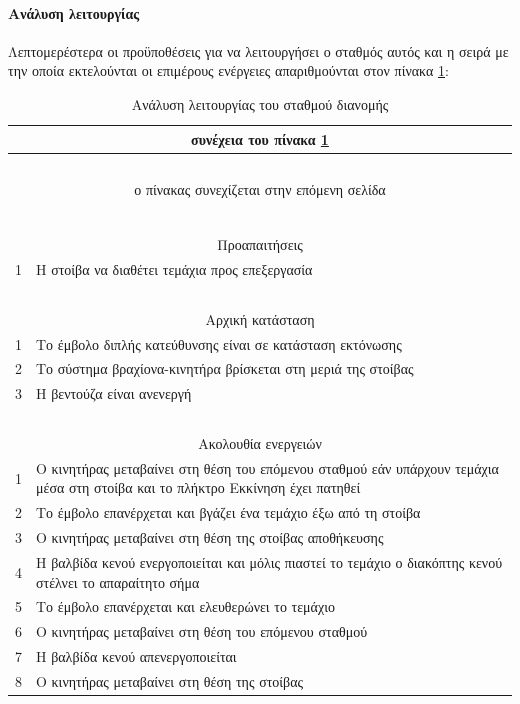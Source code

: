 \documentclass[a4paper,12pt,twoside]{report}
\begin{document}
{				\paragraph{Ανάλυση λειτουργίας} {Λεπτομερέστερα οι προϋποθέσεις για να λειτουργήσει ο σταθμός αυτός και η σειρά με την οποία εκτελούνται οι επιμέρους ενέργειες απαριθμούνται στον πίνακα \ref{πιν.:Ανάλυση λειτουργίας του σταθμού διανομής}:
				}
				\begin{longtable} { m{0.5cm} m{12cm} }
					\caption [Ανάλυση λειτουργίας του σταθμού διανομής]  {Ανάλυση λειτουργίας του σταθμού διανομής \cite{FestoMPSDistributionStationManual}}
					\label{πιν.:Ανάλυση λειτουργίας του σταθμού διανομής}\\
					\hline
					\endfirsthead
					\multicolumn{2}{c}{συνέχεια του πίνακα \ref{πιν.:Ανάλυση λειτουργίας του σταθμού διανομής}}\\
					\hline
					~\\
					\endhead
					\hline
					\multicolumn{2}{c}{ο πίνακας συνεχίζεται στην επόμενη σελίδα}\\
					\endfoot
					\multicolumn{2}{c}{ολοκληρώθηκε ο πίνακας \ref{πιν.:Ανάλυση λειτουργίας του σταθμού διανομής}}\\
					\endlastfoot
					~\\
					\multicolumn{2}{c}{Προαπαιτήσεις}\\
					1 & Η στοίβα να διαθέτει τεμάχια προς επεξεργασία\\
					\hline
					~\\
					\multicolumn{2}{c}{Αρχική κατάσταση}\\
					1 & Το έμβολο διπλής κατεύθυνσης είναι σε κατάσταση εκτόνωσης\\
					2 & Το σύστημα βραχίονα-κινητήρα βρίσκεται στη μεριά της στοίβας\\
					3 & Η βεντούζα είναι ανενεργή\\
					\hline
					~\\
					\multicolumn{2}{c}{Ακολουθία ενεργειών}\\
					1 & Ο κινητήρας μεταβαίνει στη θέση του επόμενου σταθμού εάν υπάρχουν τεμάχια μέσα στη στοίβα και το πλήκτρο Εκκίνηση έχει πατηθεί\\
					2 & Το έμβολο επανέρχεται και βγάζει ένα τεμάχιο έξω από τη στοίβα\\
					3 & Ο κινητήρας μεταβαίνει στη θέση της στοίβας αποθήκευσης\\
					4 & Η βαλβίδα κενού ενεργοποιείται και μόλις πιαστεί το τεμάχιο ο διακόπτης κενού στέλνει το απαραίτητο σήμα\\
					5 & Το έμβολο επανέρχεται και ελευθερώνει το τεμάχιο\\
					6 & Ο κινητήρας μεταβαίνει στη θέση του επόμενου σταθμού\\
					7 & Η βαλβίδα κενού απενεργοποιείται\\
					8 & Ο κινητήρας μεταβαίνει στη θέση της στοίβας\\
					\hline
				\end{longtable}
			
}
\end{document}
